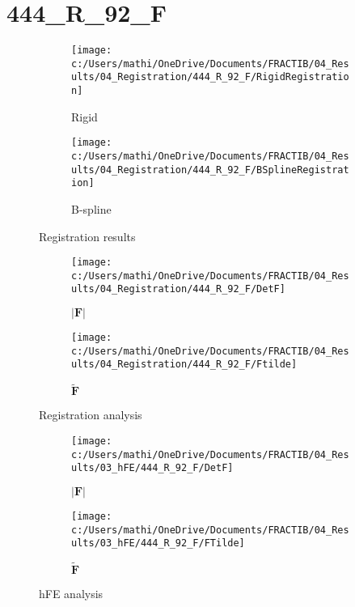 \documentclass{article}%
\begin{document}
%
\newpage%
\section*{444\_R\_92\_F}%
\label{sec:444R92F}%


\begin{figure}[h!]%
\begin{subfigure}[b]{0.5\linewidth}%
\texttt{[image: c:/Users/mathi/OneDrive/Documents/FRACTIB/04\_Results/04\_Registration/444\_R\_92\_F/RigidRegistration]}%
\caption{Rigid}%
\end{subfigure}%
\begin{subfigure}[b]{0.5\linewidth}%
\texttt{[image: c:/Users/mathi/OneDrive/Documents/FRACTIB/04\_Results/04\_Registration/444\_R\_92\_F/BSplineRegistration]}%
\caption{B{-}spline}%
\end{subfigure}%
\caption{Registration results}%
\end{figure}

%


\begin{figure}[h!]%
\begin{subfigure}[b]{0.5\linewidth}%
\texttt{[image: c:/Users/mathi/OneDrive/Documents/FRACTIB/04\_Results/04\_Registration/444\_R\_92\_F/DetF]}%
\caption{$|\mathbf{F}|$}%
\end{subfigure}%
\begin{subfigure}[b]{0.5\linewidth}%
\texttt{[image: c:/Users/mathi/OneDrive/Documents/FRACTIB/04\_Results/04\_Registration/444\_R\_92\_F/Ftilde]}%
\caption{$\tilde{\mathbf{F}}$}%
\end{subfigure}%
\caption{Registration analysis}%
\end{figure}

%


\begin{figure}[h!]%
\begin{subfigure}[b]{0.5\linewidth}%
\texttt{[image: c:/Users/mathi/OneDrive/Documents/FRACTIB/04\_Results/03\_hFE/444\_R\_92\_F/DetF]}%
\caption{$|\mathbf{F}|$}%
\end{subfigure}%
\begin{subfigure}[b]{0.5\linewidth}%
\texttt{[image: c:/Users/mathi/OneDrive/Documents/FRACTIB/04\_Results/03\_hFE/444\_R\_92\_F/FTilde]}%
\caption{$\tilde{\mathbf{F}}$}%
\end{subfigure}%
\caption{hFE analysis}%
\end{figure}
\end{document}
